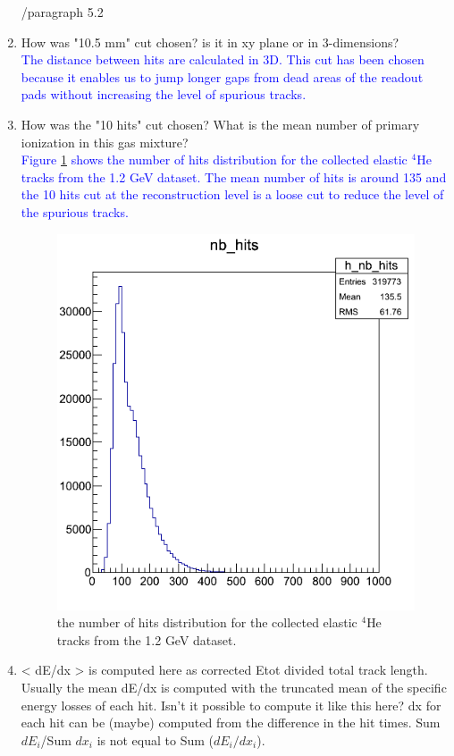 \documentclass[a4paper,11pt,twoside]{article}
\begin{document}
\begin{enumerate}
/paragraph 5.2
\item How was "10.5 mm" cut chosen? is it in xy plane or in 3-dimensions?\\
\textcolor{blue}{The distance between hits are calculated in 3D. This cut has 
been chosen because it enables us to jump longer gaps from dead areas of the 
readout pads without increasing the level of spurious tracks.} 

\item How was the "10 hits" cut chosen? What is the mean number of primary 
   ionization in this gas mixture?\\
   \textcolor{blue}{Figure \ref{fig:nb_hits} shows the number of hits 
   distribution for the collected elastic $^4$He tracks from the 1.2 GeV 
dataset. The mean number of hits is around 135 and the 10 hits cut at the 
reconstruction level is a loose cut to reduce the level of the spurious 
tracks.}

\begin{figure}[h!]
   \centering
   \includegraphics[scale=0.45]{nb_hits.png}
   \caption{the number of hits distribution for the collected elastic $^4$He 
   tracks from the 1.2 GeV dataset.} \label{fig:nb_hits}
\end{figure}


\item < dE/dx > is computed here as corrected Etot divided total track length. 
   Usually the mean dE/dx is computed with the truncated mean of the specific 
   energy losses of each hit. Isn't it possible to compute it like this here? 
   dx for each hit can be (maybe) computed from the difference in the hit 
   times. Sum $dE_{i}$/Sum $dx_{i}$ is not equal to Sum ($dE_{i}/dx_{i}$).\\
\textcolor{blue}{ } 


\end{enumerate}
\end{document}
